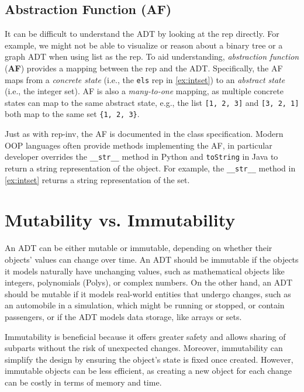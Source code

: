 \documentclass[oneside,11pt,dvipsnames]{book}
\newcommand{\code}[1]{\texttt{#1}}
\begin{document}
\subsection{Abstraction Function (AF)} 

It can be difficult to understand the ADT by looking at the rep directly. For example, we might not be able to visualize or reason about a binary tree or a graph ADT when using list as the rep. To aid understanding, \emph{abstraction function} (\textbf{AF}) provides a mapping between the rep and the ADT. 
Specifically, the AF maps from a \emph{concrete state} (i.e., the \code{els} rep in \autoref{ex:intset}) to an \emph{abstract state} (i.e., the integer set). AF is also a \emph{many-to-one} mapping, as multiple concrete states can map to the same abstract state, e.g., the list \code{[1, 2, 3]} and \code{[3, 2, 1]} both map to the same set \code{\{1, 2, 3\}}. 

Just as with rep-inv, the AF is documented in the class specification. Modern OOP languages often provide methods implementing the AF, in particular developer overrides the \code{\_\_str\_\_} method in Python and \code{toString} in Java to return a string representation of the object. For example, the \code{\_\_str\_\_} method in \autoref{ex:intset} returns a string representation of the set.




\section{Mutability vs. Immutability}\label{sec:mutability-vs-immutability}

An ADT can be either mutable or immutable, depending on whether their objects' values can change over time. An ADT should be immutable if the objects it models naturally have unchanging values, such as mathematical objects like integers, polynomials (Polys), or complex numbers. On the other hand, an ADT should be mutable if it models real-world entities that undergo changes, such as an automobile in a simulation, which might be running or stopped, or contain passengers, or if the ADT models data storage, like arrays or sets.

Immutability is beneficial because it offers greater safety and allows sharing of subparts without the risk of unexpected changes. Moreover, immutability can simplify the design by ensuring the object’s state is fixed once created. However, immutable objects can be less efficient, as creating a new object for each change can be costly in terms of memory and time.
\end{document}
